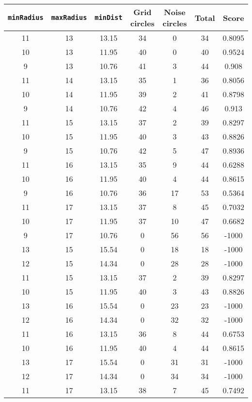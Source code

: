 \documentclass[letterpaper, 12pt]{article}
\begin{document}
\begin{longtable}{|c|c|c|c|c|c|c|}
\hline
\textbf{\texttt{minRadius}} & \textbf{\texttt{maxRadius}} & \textbf{\texttt{minDist}} & \textbf{Grid circles} & \textbf{Noise circles} & \textbf{Total} & \textbf{Score} \\
\hline
11 & 13 & 13.15 & 34 & 0 & 34 & 0.8095 \\
\hline
10 & 13 & 11.95 & 40 & 0 & 40 & 0.9524 \\
\hline
9 & 13 & 10.76 & 41 & 3 & 44 & 0.908 \\
\hline
11 & 14 & 13.15 & 35 & 1 & 36 & 0.8056 \\
\hline
10 & 14 & 11.95 & 39 & 2 & 41 & 0.8798 \\
\hline
9 & 14 & 10.76 & 42 & 4 & 46 & 0.913 \\
\hline
11 & 15 & 13.15 & 37 & 2 & 39 & 0.8297 \\
\hline
10 & 15 & 11.95 & 40 & 3 & 43 & 0.8826 \\
\hline
9 & 15 & 10.76 & 42 & 5 & 47 & 0.8936 \\
\hline
11 & 16 & 13.15 & 35 & 9 & 44 & 0.6288 \\
\hline
10 & 16 & 11.95 & 40 & 4 & 44 & 0.8615 \\
\hline
9 & 16 & 10.76 & 36 & 17 & 53 & 0.5364 \\
\hline
11 & 17 & 13.15 & 37 & 8 & 45 & 0.7032 \\
\hline
10 & 17 & 11.95 & 37 & 10 & 47 & 0.6682 \\
\hline
9 & 17 & 10.76 & 0 & 56 & 56 & -1000 \\
\hline
13 & 15 & 15.54 & 0 & 18 & 18 & -1000 \\
\hline
12 & 15 & 14.34 & 0 & 28 & 28 & -1000 \\
\hline
11 & 15 & 13.15 & 37 & 2 & 39 & 0.8297 \\
\hline
10 & 15 & 11.95 & 40 & 3 & 43 & 0.8826 \\
\hline
13 & 16 & 15.54 & 0 & 23 & 23 & -1000 \\
\hline
12 & 16 & 14.34 & 0 & 32 & 32 & -1000 \\
\hline
11 & 16 & 13.15 & 36 & 8 & 44 & 0.6753 \\
\hline
10 & 16 & 11.95 & 40 & 4 & 44 & 0.8615 \\
\hline
13 & 17 & 15.54 & 0 & 31 & 31 & -1000 \\
\hline
12 & 17 & 14.34 & 0 & 34 & 34 & -1000 \\
\hline
11 & 17 & 13.15 & 38 & 7 & 45 & 0.7492 \\
\hline

\end{longtable}
\end{document}
